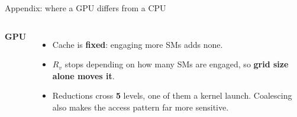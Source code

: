\documentclass{beamerTCD}
\newcommand{\Rv}{R_v}
\begin{document}
\begin{frame}[t]{Appendix: where a GPU differs from a CPU}
\begin{columns}[T]
    \footnotesize
    \textbf{GPU}
    \begin{itemize}
      \item Cache is \textbf{fixed}: engaging more SMs adds none.
      \item $\Rv$ stops depending on how many SMs are engaged, so \textbf{grid size alone moves it}.
      \item Reductions cross \textbf{5} levels, one of them a kernel launch.
            Coalescing also makes the access pattern far more sensitive.
    \end{itemize}
  \end{columns}

\end{frame}

\end{document}
